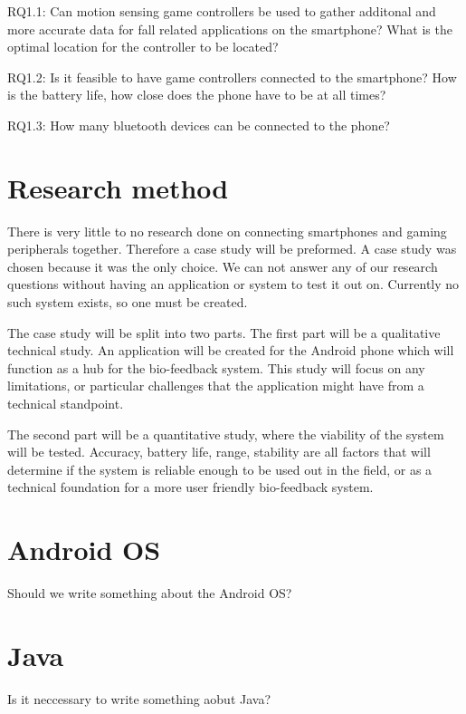 \documentclass[11pt,twoside,a4paper]{report}
\begin{document}
RQ1.1: Can motion sensing game controllers be used to gather additonal and more accurate data for fall related applications on the smartphone? What is the optimal location for the controller to be located?

RQ1.2: Is it feasible to have game controllers connected to the smartphone? How is the battery life, how close does the phone have to be at all times?

RQ1.3: How many bluetooth devices can be connected to the phone?


\section{Research method}
There is very little to no research done on connecting smartphones and gaming peripherals together. Therefore a case study will be preformed. A case study was chosen because it was the only choice. We can not answer any of our research questions without having an application or system to test it out on. Currently no such system exists, so one must be created.

The case study will be split into two parts. The first part will be a qualitative technical study. An application will be created for the Android phone which will function as a hub for the bio-feedback system. This study will focus on any limitations, or particular challenges that the application might have from a technical standpoint.

The second part will be a quantitative study, where the viability of the system will be tested. Accuracy, battery life, range, stability are all factors that will determine if the system is reliable enough to be used out in the field, or as a technical foundation for a more user friendly bio-feedback system.



\section{Android OS}
Should we write something about the Android OS?

\section{Java}
Is it neccessary to write something aobut Java?
\end{document}
